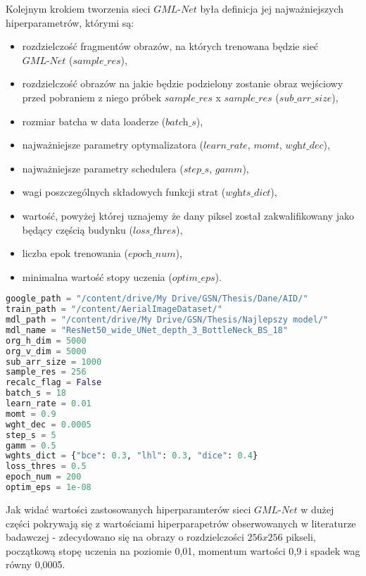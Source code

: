 \cell
Kolejnym krokiem tworzenia sieci $\textit{GML-Net}$ była definicja jej najważniejszych hiperparametrów, którymi są:
\begin{itemize}
  \item rozdzielczość fragmentów obrazów, na których trenowana będzie sieć $\textit{GML-Net}$ ($\textit{sample$\_$res}$), 
  \item rozdzielczość obrazów na jakie będzie podzielony zostanie obraz wejściowy przed pobraniem z niego próbek $\textit{sample$\_$res}$ x $\textit{sample$\_$res}$ ($\textit{sub$\_$arr$\_$size}$),
  \item rozmiar batcha w data loaderze ($\textit{batch$\_$s}$),
  \item najważniejsze parametry optymalizatora ($\textit{learn$\_$rate}$, $\textit{momt}$, $\textit{wght$\_$dec}$),
  \item najważniejsze parametry schedulera ($\textit{step$\_$s}$, $\textit{gamm}$),
  \item wagi poszczególnych składowych funkcji strat ($\textit{wghts$\_$dict}$),
  \item wartość, powyżej której uznajemy że dany piksel został zakwalifikowany jako będący częścią budynku ($\textit{loss$\_$thres}$),
  \item liczba epok trenowania ($\textit{epoch$\_$num}$),
  \item minimalna wartość stopy uczenia ($\textit{optim$\_$eps}$). 
\end{itemize}
\vspace{1cm}

\cell
\begin{lstlisting}[name=Rozdzial3.1, language=Python]
google_path = "/content/drive/My Drive/GSN/Thesis/Dane/AID/"
train_path = "/content/AerialImageDataset/"
mdl_path = "/content/drive/My Drive/GSN/Thesis/Najlepszy model/"
mdl_name = "ResNet50_wide_UNet_depth_3_BottleNeck_BS_18"
org_h_dim = 5000
org_v_dim = 5000
sub_arr_size = 1000
sample_res = 256
recalc_flag = False
batch_s = 18
learn_rate = 0.01
momt = 0.9
wght_dec = 0.0005
step_s = 5
gamm = 0.5
wghts_dict = {"bce": 0.3, "lhl": 0.3, "dice": 0.4}
loss_thres = 0.5
epoch_num = 200
optim_eps = 1e-08
\end{lstlisting}


\cell
Jak widać wartości zastosowanych hiperparamterów sieci $\textit{GML-Net}$ w dużej części pokrywają się z wartościami hiperparapetrów obserwowanych w literaturze badawczej - zdecydowano się na obrazy o rozdzielczości $\textit{256x256}$ pikseli, początkową stopę uczenia na poziomie 0,01, momentum wartości 0,9 i spadek wag równy 0,0005.

